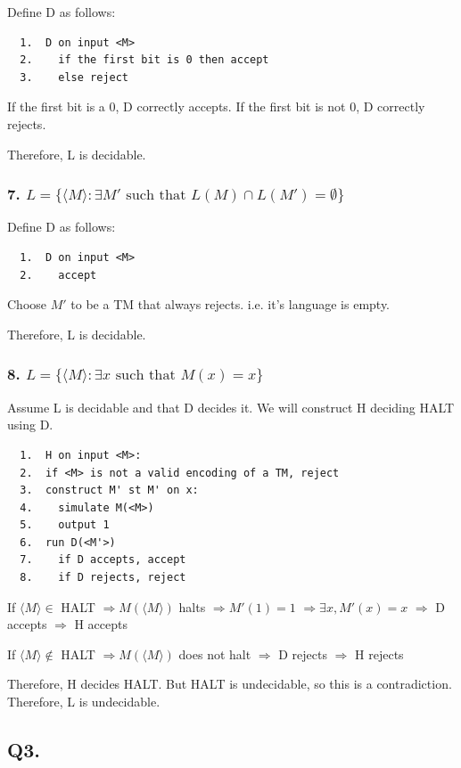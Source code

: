 \documentclass[letterpaper]{article}
\begin{document}
Define D as follows:
\begin{lstlisting}
  1.  D on input <M>
  2.    if the first bit is 0 then accept
  3.    else reject
\end{lstlisting}

If the first bit is a 0, D correctly accepts. If the first bit
is not 0, D correctly rejects.

Therefore, L is decidable.

\subsubsection*{7. $L = \{ \langle M \rangle : \exists M' \text{ such that } L(M) \cap L(M') = \emptyset \}$}

Define D as follows:
\begin{lstlisting}
  1.  D on input <M>
  2.    accept
\end{lstlisting}

Choose $M'$ to be a TM that always rejects. i.e. it's language is empty.

Therefore, L is decidable.

\subsubsection*{8. $L = \{ \langle M \rangle : \exists x \text{ such that } M(x) = x \}$}

Assume L is decidable and that D decides it.
We will construct H deciding HALT using D.

\begin{verbatim}
  1.  H on input <M>:
  2.  if <M> is not a valid encoding of a TM, reject 
  3.  construct M' st M' on x:
  4.    simulate M(<M>)
  5.    output 1
  6.  run D(<M'>)
  7.    if D accepts, accept 
  8.    if D rejects, reject
\end{verbatim}

If $\langle M \rangle \in$ HALT
$\Rightarrow M(\langle M \rangle)$ halts
$\Rightarrow M'(1) = 1$
$\Rightarrow \exists x, M'(x) = x$
$\Rightarrow $ D accepts
$\Rightarrow$ H accepts

If $\langle M \rangle \notin$ HALT
$\Rightarrow M(\langle M \rangle)$ does not halt
$\Rightarrow $ D rejects
$\Rightarrow$ H rejects

Therefore, H decides HALT. But HALT is undecidable,
so this is a contradiction. Therefore, L is undecidable.

\subsection*{Q3.}
\end{document}
